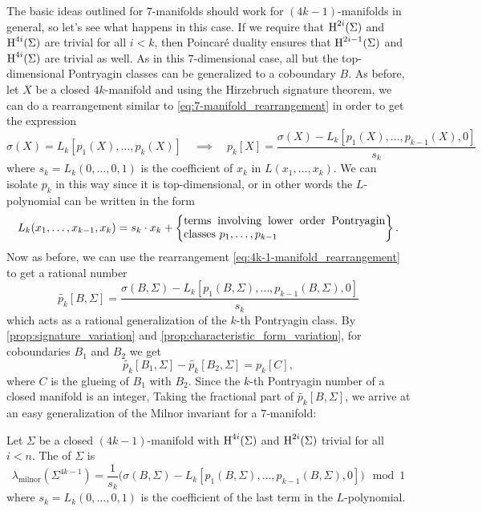 The basic ideas outlined for $7$-manifolds should work for $(4k-1)$-manifolds in general, so let's see what happens in this case. If we require that $\operatorname{H}^{2i}(\Sigma)$ and $\operatorname{H}^{4i}(\Sigma)$ are trivial for all $i<k$, then Poincar\'e duality ensures that $\operatorname{H}^{2i-1}(\Sigma)$ and $\operatorname{H}^{4i}(\Sigma)$ are trivial as well. As in this $7$-dimensional case, all but the top-dimensional Pontryagin classes can be generalized to a coboundary $B$.
As before, let $X$ be a closed $4k$-manifold and using the Hirzebruch signature theorem, we can do a rearrangement similar to \cref{eq:7-manifold_rearrangement} in order to get the expression
\begin{equation}\label{eq:4k-1-manifold_rearrangement}
	\sigma(X) = L_k[p_1(X), \ldots, p_k(X)]\quad\implies\quad 
	p_k[X] = \frac{\sigma(X) - L_k[p_1(X),\ldots, p_{k-1}(X), 0]}{s_k}
\end{equation}
where $s_k=L_k(0,\ldots, 0, 1)$ is the coefficient of $x_k$ in $L(x_1,\ldots, x_k)$.
We can isolate $p_k$ in this way since it is top-dimensional, or in other words the $L$-polynomial can be written in the form
\[
	L_k(x_1,\ldots, x_{k-1}, x_k) = s_k\cdot x_k + 
	\left\{\parbox{18em}{terms involving lower order Pontryagin classes $p_1,\ldots, p_{k-1}$}\right\}.
\]
Now as before, we can use the rearrangement \cref{eq:4k-1-manifold_rearrangement} to get a rational number
\[
	\widetilde{p_k}[B, \Sigma] = \frac{\sigma(B, \Sigma) - L_k[p_1(B, \Sigma),\ldots, p_{k-1}(B, \Sigma), 0]}{s_k}
\]
which acts as a rational generalization of the $k$-th Pontryagin class. By \cref{prop:signature_variation} and \cref{prop:characteristic_form_variation}, for coboundaries $B_1$ and $B_2$ we get
\[
		\widetilde{p_k}[B_1, \Sigma] - \widetilde{p_k}[B_2, \Sigma] = p_k[C],
\]
where $C$ is the glueing of $B_1$ with $B_2$. Since the $k$-th Pontryagin number of a closed manifold is an integer, Taking the fractional part of $\widetilde{p_k}[B,\Sigma]$, we arrive at an easy generalization of the Milnor invariant for a $7$-manifold:

\begin{definition}
	Let $\Sigma$ be a closed $(4k-1)$-manifold with $\operatorname{H}^{4i}(\Sigma)$ and $\operatorname{H}^{2i}(\Sigma)$ trivial for all $i<n$. The  of $\Sigma$ is
	\[
		\boxed{
			\lambda_{\mathrm{milnor}}(\Sigma^{4k-1}) = \frac{1}{s_k}\Big(\sigma(B, \Sigma) - L_k[p_1(B, \Sigma), \ldots, p_{k-1}(B,\Sigma),0]\Big)\mod 1
		}
	\]
	where $s_k = L_k(0,\ldots,0,1)$ is the coefficient of the last term in the $L$-polynomial.
\end{definition}


